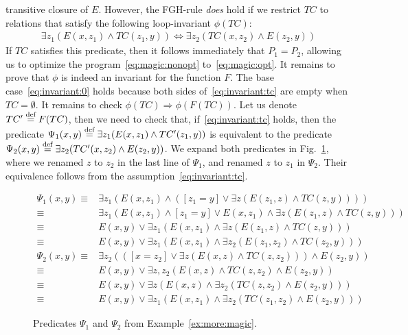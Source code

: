 \begin{ex}
transitive closure of $E$.  However, the FGH-rule {\em does} hold if
we restrict $TC$ to relations that satisfy the following
loop-invariant $\phi(TC)$:
%
\begin{align}
  \exists z_1 (E(x,z_1)\wedge TC(z_1,y))\Leftrightarrow \exists z_2 (TC(x,z_2)\wedge E(z_2,y)) \label{eq:invariant:tc}
\end{align}
%
If $TC$ satisfies this predicate, then it follows immediately that
$P_1=P_2$, allowing us to optimize the program~\eqref{eq:magic:nonopt}
to~\eqref{eq:magic:opt}.  It remains to prove that $\phi$ is indeed an
invariant for the function $F$.  The base case~\eqref{eq:invariant:0}
holds because both sides of~\eqref{eq:invariant:tc} are empty when
$TC=\emptyset$.  It remains to check
$\phi(TC)\Rightarrow \phi(F(TC))$.  Let us denote $TC'\stackrel{\text{def}}{=} F(TC)$,
then we need to check that, if~\eqref{eq:invariant:tc} holds, then the
predicate $\Psi_1(x,y) \stackrel{\text{def}}{=} \exists z_1 (E(x,z_1)\wedge TC'(z_1,y))$
is equivalent to the predicate
$\Psi_2(x,y) \stackrel{\text{def}}{=} \exists z_2 (TC'(x,z_2)\wedge E(z_2,y))$.  We
expand both predicates in Fig.~\ref{fig:more:magic:1:2}, where we
renamed $z$ to $z_2$ in the last line of $\Psi_1$, and renamed $z$ to
$z_1$ in $\Psi_2$.  Their equivalence follows from the
assumption~\eqref{eq:invariant:tc}.
\end{ex}

\begin{figure}
\begin{align*}
\Psi_1(x,y)
  \equiv & \exists z_1 \left(E(x,z_1)\wedge \left(
                [z_1=y] \vee \exists z(E(z_1,z) \wedge TC(z,y))
                \right)\right)\\
  \equiv & \exists z_1 \left(E(x,z_1)\wedge [z_1=y]  \vee E(x,z_1)\wedge \exists z(E(z_1,z) \wedge TC(z,y))\right)\\
  \equiv & E(x,y) \vee \exists z_1 (E(x,z_1) \wedge \exists z(E(z_1,z) \wedge TC(z,y)))\\
  \equiv & E(x,y) \vee \exists z_1 (E(x,z_1) \wedge \exists z_2(E(z_1,z_2) \wedge TC(z_2,y)))\\
  \Psi_2(x,y) \equiv &  \exists z_2  \left(
                \left([x=z_2] \vee \exists z(E(x,z) \wedge TC(z,z_2))\right)
                \wedge E(z_2,y)
                \right) \\
  \equiv & E(x,y) \vee \exists z, z_2 (E(x,z) \wedge TC(z,z_2) \wedge E(z_2,y))\\
  \equiv & E(x,y) \vee \exists z (E(x,z) \wedge \exists z_2(TC(z,z_2) \wedge E(z_2,y)))\\
  \equiv & E(x,y) \vee \exists z_1 (E(x,z_1) \wedge \exists z_2(TC(z_1,z_2) \wedge E(z_2,y)))
\end{align*}
\caption{Predicates $\Psi_1$ and $\Psi_2$ from Example~\ref{ex:more:magic}.}
  \label{fig:more:magic:1:2}
\end{figure}

